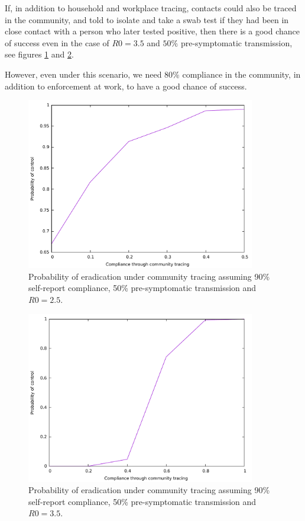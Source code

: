 \documentclass{article}
\begin{document}
If, in addition to household and workplace tracing, contacts could also be traced in the community, and told to isolate and take a swab test if they had been in close contact with a person who later tested positive, then there is a good chance of success even in the case of $R0 = 3.5$ and $50\%$ pre-symptomatic transmission, see figures \ref{fulltrace2.5} and \ref{fulltrace3.5}.

However, even under this scenario, we need 80\% compliance in the community, in addition to enforcement at work, to have a good chance of success.

\begin{figure}
\begin{center}
\includegraphics[width = 10cm]{fullTrace50pre25R0.pdf}
\end{center}
\caption{Probability of eradication under community tracing assuming 90\% self-report compliance, 50\% pre-symptomatic transmission and $R0 = 2.5$.}
\label{fulltrace2.5}
\end{figure}

\begin{figure}
\begin{center}
\includegraphics[width = 10cm]{fullTrace50pre35R0.pdf}
\end{center}
\caption{Probability of eradication under community tracing assuming 90\% self-report compliance, 50\% pre-symptomatic transmission and $R0 = 3.5$.}
\label{fulltrace3.5}
\end{figure}
\end{document}
